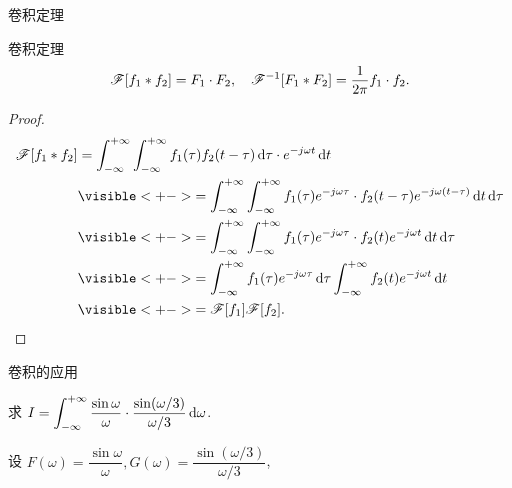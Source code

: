 \begin{frame}{卷积定理\noexer}
	\onslide<+->
	\begin{main}{卷积定理}
	\[\mathscr{F}[f_1\ast f_2]=F_1\cdot F_2,\quad
	\mathscr{F}^{-1}[F_1\ast F_2]=\frac1{2\pi}f_1\cdot f_2.\]
	\vspace{-\baselineskip}
	\end{main}

	\onslide<+->
	\begin{proof}
		\vspace{-\baselineskip}
		\begin{align*}
			\msf[f_1\ast f_2]&=\int_{-\infty}^{+\infty}\int_{-\infty}^{+\infty}f_1(\tau)f_2(t-\tau)\diff \tau \cdot e^{-j\omega t}\diff t\\
			&\visible<+->{=\int_{-\infty}^{+\infty}\int_{-\infty}^{+\infty}f_1(\tau)e^{-j\omega \tau}\cdot f_2(t-\tau)e^{-j\omega (t-\tau)}\diff t\diff \tau}\\
			&\visible<+->{=\int_{-\infty}^{+\infty}\int_{-\infty}^{+\infty}f_1(\tau)e^{-j\omega \tau}\cdot f_2(t)e^{-j\omega t}\diff t\diff \tau}\\
			&\visible<+->{=\int_{-\infty}^{+\infty}f_1(\tau)e^{-j\omega \tau}\diff\tau\int_{-\infty}^{+\infty}f_2(t)e^{-j\omega t}\diff t}\\
			&\visible<+->{=\msf[f_1]\msf[f_2].\qedhere}
		\end{align*}
	\end{proof}
\end{frame}


\begin{frame}{卷积的应用\noexer}
	\onslide<+->
	\begin{example}
		求 $\displaystyle	I=\int_{-\infty}^{+\infty}\frac{\sin \omega}{\omega}\cdot \frac{\sin (\omega/3)}{\omega/3}\,\mathrm{d}\omega$.
	\end{example}

	\onslide<+->
	\begin{solution}
			设 $F(\omega)=\dfrac{\sin\omega}{\omega},G(\omega)=\dfrac{\sin(\omega/3)}{\omega/3}$,%
		\onslide<+->{
			\[\msf^{-1}[FG](0)=\frac1{2\pi}\int_{-\infty}^{+\infty}F(\omega)G(\omega)\diff\omega=\frac1{2\pi}I.\]
		}
	\end{solution}
\end{frame}


